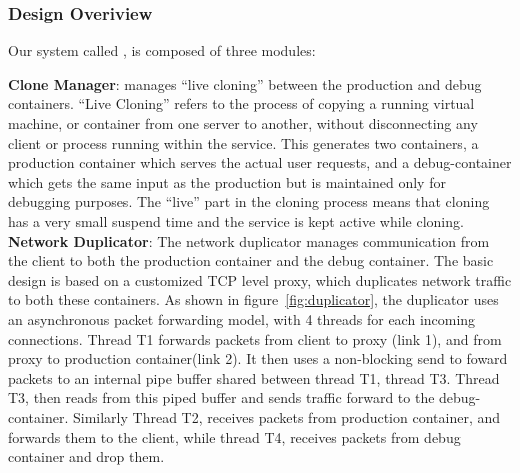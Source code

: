 \subsubsection{Design Overiview}
\label{sec:designBackground}

Our system called \parikshan, is composed of three modules: 


 \textbf{Clone Manager}: manages ``live cloning'' between the production and debug containers.
``Live Cloning'' refers to the process of copying a running virtual machine, or container from one server to another, without disconnecting any client or process running within the service.
This generates two containers, a production container which serves the actual user requests, and a debug-container which gets the same input as the production but is maintained only for debugging purposes.
The ``live'' part in the cloning process means that cloning has a very small suspend time and the service is kept active while cloning. \\

\iffalse	
	\begin{figure}[ht]
		\begin{centering}
			\texttt{[image: figs/network\_dup.pdf]}
			\caption{Description of the Network Duplicator. In \textit{synchronized} mode: Thread 1 executes steps [1,3,5], and Thread 2 executes [2,4,6] sequentially. In \textit{asynchronous} mode: Thread 1 executes steps [1,3], Thread 2 executes [2,4], Thread 3 executes [5], and Thread 4 executes [6]}
			\label{fig:duplicator}
		\end{centering}
	\end{figure}
\fi
 \textbf{Network Duplicator}: The network duplicator manages communication from the client to both the production container and the debug container.
The basic design is based on a customized TCP level proxy, which duplicates network traffic to both these containers.
As shown in figure~\ref{fig:duplicator}, the duplicator uses an asynchronous packet forwarding model, with 4 threads for each incoming connections.
Thread T1 forwards packets from client to proxy (link 1), and from proxy to production container(link 2). It then uses a non-blocking send to foward packets to an internal pipe buffer shared between thread T1, thread T3. Thread T3, then reads from this piped buffer and sends traffic forward to the debug-container. 
Similarly Thread T2, receives packets from production container, and forwards them to the client, while thread T4, receives packets from debug container and drop them. 

